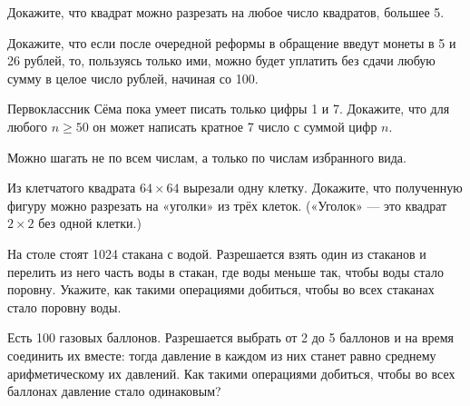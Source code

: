 \documentclass[12pt,a4paper]{article}
\begin{document}


Докажите, что квадрат можно разрезать на любое число квадратов, большее 5.


Докажите, что если после очередной реформы в обращение введут монеты в 5 и 26 рублей,
то, пользуясь только ими, можно будет уплатить без сдачи любую сумму в целое число рублей, начиная со 100.



Первоклассник Сёма пока умеет писать только цифры 1 и 7.
Докажите, что для любого $n\geq50$ он может написать кратное 7 число с суммой цифр $n$.




Можно шагать не по всем числам, а только по числам избранного вида.

Из клетчатого квадрата $64\times64$ вырезали одну клетку. Докажите, что полученную фигуру
можно разрезать на «уголки» из трёх клеток. («Уголок» — это квадрат $2 \times 2$ без одной клетки.)

На столе стоят 1024 стакана с водой. Разрешается взять один из стаканов и перелить
из него часть воды в стакан, где воды меньше так, чтобы воды стало поровну. Укажите,
как такими операциями добиться, чтобы во всех стаканах стало поровну воды.


Есть 100 газовых баллонов. Разрешается выбрать от 2 до 5 баллонов и на время
соединить их вместе: тогда давление в каждом из них станет равно среднему
арифметическому их давлений. Как такими операциями добиться, чтобы во всех баллонах
давление стало одинаковым?



%
%
%


\end{document}
